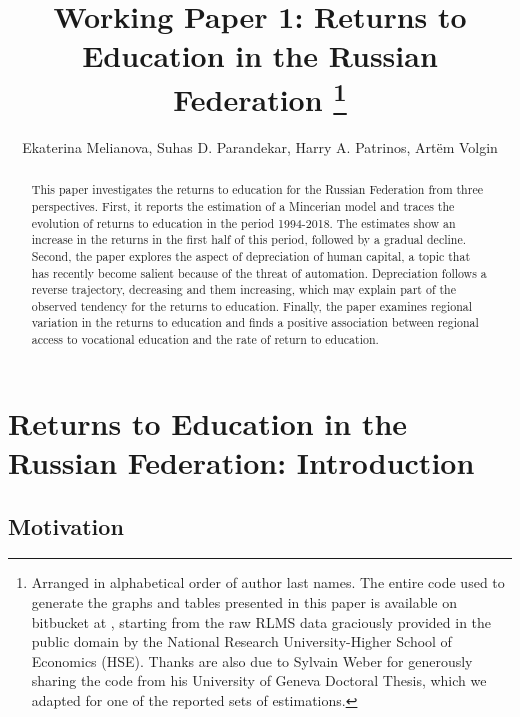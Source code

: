 \documentclass[12pt,a4paper]{article}
\numberwithin{equation}{section}
\begin{document}
\title{Working Paper 1: Returns to Education in the Russian Federation \footnote{Arranged in alphabetical order of author last names. The entire code used to generate the graphs and tables presented in this paper is available on bitbucket at  , starting from the raw RLMS data graciously provided in the public domain by the National Research University-Higher School of Economics (HSE). Thanks are also due to Sylvain Weber for generously sharing the code from his University of Geneva Doctoral Thesis, which we adapted for one of the reported sets of estimations.}}
\author{Ekaterina Melianova, Suhas D. Parandekar, Harry A. Patrinos, Art\"{e}m Volgin}
\maketitle

\begin{abstract}
This paper investigates the returns to education for the Russian Federation from three perspectives. First, it reports the estimation of a Mincerian model and traces the evolution of returns to education in the period 1994-2018. The estimates show an increase in the returns in the first half of this period, followed by a gradual decline. Second, the paper explores the aspect of depreciation of human capital, a topic that has recently become salient because of the threat of automation. Depreciation follows a reverse trajectory, decreasing and them increasing, which may explain part of the observed tendency for the returns to education. Finally, the paper examines regional variation in the returns to education and finds a positive association between regional access to vocational education and the rate of return to education. 
\end{abstract}

\section{Returns to Education in the Russian Federation: Introduction}

\subsection{Motivation}
\end{document}
